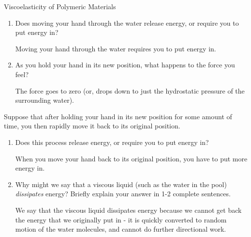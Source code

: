 \begin{activity}{Viscoelasticity of Polymeric Materials}
\begin{ctqs}
\begin{enumerate}
				\begin{solution}[1.2in]
					The force is proportional to the rate of displacement - it is high while you are actively moving your hand, but then drops off as soon as your hand is no longer moving.
				\end{solution}
			
			\item Does moving your hand through the water release energy, or require you to put energy in?
			
				\begin{solution}[1.1in]
					Moving your hand through the water requires you to put energy in.
				\end{solution}
				
			\item As you hold your hand in its new position, what happens to the force you feel?
			
				\begin{solution}[1in]
					The force goes to zero (or, drops down to just the hydrostatic pressure of the surrounding water).
				\end{solution}
			
		\end{enumerate}
		
	\question Suppose that after holding your hand in its new position for some amount of time, you then rapidly move it back to its original position.
	
		\begin{enumerate}
			
			\item Does this process release energy, or require you to put energy in?
			
				\begin{solution}[1in]
					When you move your hand back to its original position, you have to put more energy in.
				\end{solution}
			
			\item Why might we say that a viscous liquid (such as the water in the pool) \emph{dissipates} energy? Briefly explain your answer in 1-2 complete sentences.
			
				\begin{solution}[2in]
					We say that the viscous liquid dissipates energy because we cannot get back the energy that we originally put in - it is quickly converted to random motion of the water molecules, and cannot do further directional work.
				\end{solution}
			

\end{enumerate}
\end{ctqs}
\end{activity}
